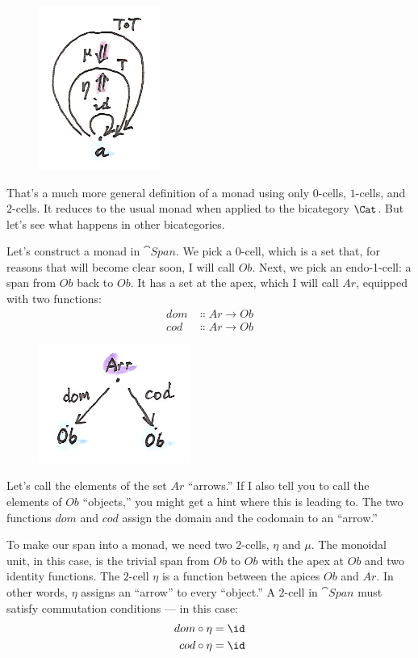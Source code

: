 \begin{figure}[H]
\centering
\includegraphics[width=40mm]{images/bimonad.png}
\end{figure}

\noindent
That's a much more general definition of a monad using only $0$-cells,
$1$-cells, and $2$-cells. It reduces to the usual monad when applied to the
bicategory $\Cat$. But let's see what happens in other
bicategories.

Let's construct a monad in $\cat{Span}$. We pick a $0$-cell, which is a
set that, for reasons that will become clear soon, I will call
$Ob$. Next, we pick an endo-1-cell: a span from $Ob$ back
to $Ob$. It has a set at the apex, which I will call $Ar$,
equipped with two functions:
\begin{align*}
dom &\Colon Ar \to Ob \\
cod &\Colon Ar \to Ob
\end{align*}

\begin{figure}[H]
\centering
\includegraphics[width=50mm]{images/spanmonad.png}
\end{figure}

\noindent
Let's call the elements of the set $Ar$ ``arrows.'' If I also
tell you to call the elements of $Ob$ ``objects,'' you might get
a hint where this is leading to. The two functions $dom$ and
$cod$ assign the domain and the codomain to an ``arrow.''

To make our span into a monad, we need two $2$-cells, $\eta$ and
$\mu$. The monoidal unit, in this case, is the trivial span from
$Ob$ to $Ob$ with the apex at $Ob$ and two identity
functions. The $2$-cell $\eta$ is a function between the apices
$Ob$ and $Ar$. In other words, $\eta$ assigns an
``arrow'' to every ``object.'' A $2$-cell in $\cat{Span}$ must satisfy
commutation conditions --- in this case:
\begin{align*}
dom &\circ \eta = \id \\
cod &\circ \eta = \id
\end{align*}

